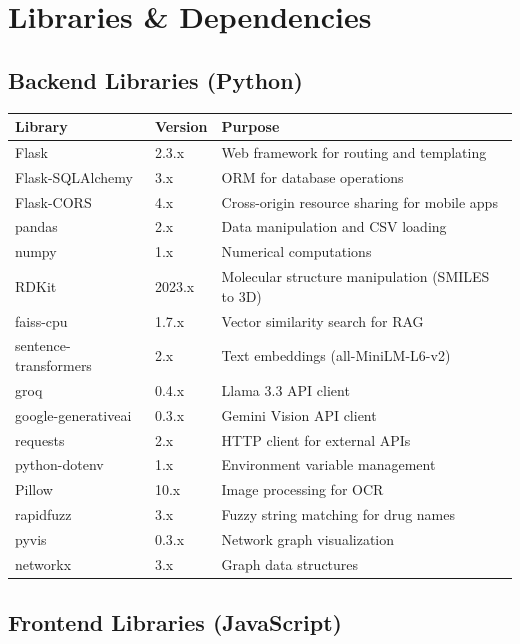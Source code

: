 \documentclass[12pt,a4paper]{report}
\begin{document}
\newpage

\chapter{Libraries \& Dependencies}

\section{Backend Libraries (Python)}

\begin{longtable}{|l|l|X|}
\hline
\textbf{Library} & \textbf{Version} & \textbf{Purpose} \\
\hline
\endhead
Flask & 2.3.x & Web framework for routing and templating \\
\hline
Flask-SQLAlchemy & 3.x & ORM for database operations \\
\hline
Flask-CORS & 4.x & Cross-origin resource sharing for mobile apps \\
\hline
pandas & 2.x & Data manipulation and CSV loading \\
\hline
numpy & 1.x & Numerical computations \\
\hline
RDKit & 2023.x & Molecular structure manipulation (SMILES to 3D) \\
\hline
faiss-cpu & 1.7.x & Vector similarity search for RAG \\
\hline
sentence-transformers & 2.x & Text embeddings (all-MiniLM-L6-v2) \\
\hline
groq & 0.4.x & Llama 3.3 API client \\
\hline
google-generativeai & 0.3.x & Gemini Vision API client \\
\hline
requests & 2.x & HTTP client for external APIs \\
\hline
python-dotenv & 1.x & Environment variable management \\
\hline
Pillow & 10.x & Image processing for OCR \\
\hline
rapidfuzz & 3.x & Fuzzy string matching for drug names \\
\hline
pyvis & 0.3.x & Network graph visualization \\
\hline
networkx & 3.x & Graph data structures \\
\hline
\end{longtable}

\section{Frontend Libraries (JavaScript)}
\end{document}
